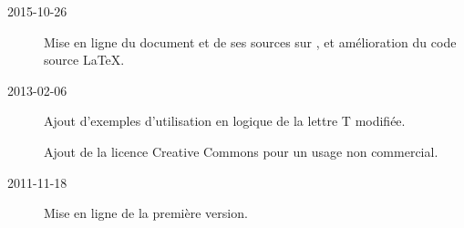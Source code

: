 
\begin{description}
	\item[2015-10-26] Mise en ligne du document et de ses sources sur , et amélioration du code source \LaTeX.

	\item[2013-02-06] Ajout d'exemples d'utilisation en logique de la lettre T modifiée.

Ajout de la licence Creative Commons pour un usage non commercial.

	\item[2011-11-18] Mise en ligne de la première version.
\end{description}